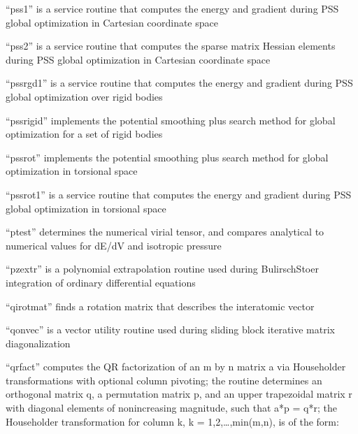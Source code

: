 \documentclass[letterpaper,11pt,english]{sphinxmanual}
\begin{document}

“pss1” is a service routine that computes the energy
and gradient during PSS global optimization in Cartesian
coordinate space


“pss2” is a service routine that computes the sparse
matrix Hessian elements during PSS global optimization
in Cartesian coordinate space


“pssrgd1” is a service routine that computes the energy and
gradient during PSS global optimization over rigid bodies


“pssrigid” implements the potential smoothing plus search method
for global optimization for a set of rigid bodies


“pssrot” implements the potential smoothing plus search method
for global optimization in torsional space


“pssrot1” is a service routine that computes the energy and
gradient during PSS global optimization in torsional space



“ptest” determines the numerical virial tensor, and compares
analytical to numerical values for dE/dV and isotropic pressure



“pzextr” is a polynomial extrapolation routine used during
Bulirsch\sphinxhyphen{}Stoer integration of ordinary differential equations


“qirotmat” finds a rotation matrix that describes the
interatomic vector


“qonvec” is a vector utility routine used during sliding
block iterative matrix diagonalization


“qrfact” computes the QR factorization of an m by n matrix a
via Householder transformations with optional column pivoting;
the routine determines an orthogonal matrix q, a permutation
matrix p, and an upper trapezoidal matrix r with diagonal
elements of nonincreasing magnitude, such that a*p = q*r; the
Householder transformation for column k, k = 1,2,…,min(m,n),
is of the form:
\end{document}
